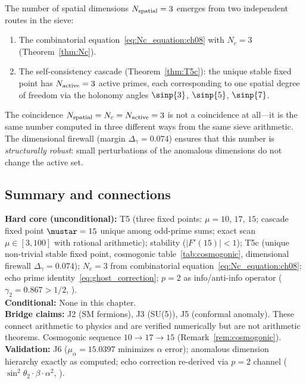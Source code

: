 \documentclass[12pt,a4paper]{article}
\begin{document}
\begin{remark}
\label{rem:3d_theorem}
The number of spatial dimensions $N_{\rm spatial} = 3$ emerges from
two independent routes in the sieve:
\begin{enumerate}[nosep]
\item The combinatorial equation~\eqref{eq:Nc_equation:ch08} with
  $N_c = 3$ (Theorem~\ref{thm:Nc}).
\item The self-consistency cascade
  (Theorem~\ref{thm:T5c}): the unique stable fixed point has
  $N_{\rm active} = 3$ active primes, each corresponding to one
  spatial degree of freedom via the holonomy angles
  $\sinp{3}$, $\sinp{5}$, $\sinp{7}$.
\end{enumerate}
The coincidence $N_{\rm spatial} = N_c = N_{\rm active} = 3$ is not
a coincidence at all---it is the same number computed in three
different ways from the same sieve arithmetic.  The dimensional
firewall (margin $\Delta_\gamma = 0.074$) ensures that this number
is \emph{structurally robust}: small perturbations of the anomalous
dimensions do not change the active set.
\end{remark}

\subsection{Summary and connections}
\label{sec:ch8_summary}

\begin{ledgerbox}
\textbf{Hard core (unconditional):} T5 (three fixed points:
  $\mu = 10$, $17$, $15$; cascade fixed point $\mustar = 15$ unique
  among odd-prime sums; exact scan $\mu \in [3,100]$ with rational
  arithmetic); stability ($|F'(15)| < 1$);
  T5c (unique non-trivial stable fixed point, cosmogonic
  table~\ref{tab:cosmogonic}, dimensional firewall
  $\Delta_\gamma = 0.074$);
  $N_c = 3$ from combinatorial equation~\eqref{eq:Nc_equation:ch08};
  echo prime identity~\eqref{eq:ghost_correction};
  $p = 2$ as info/anti-info operator ($\gamma_2 = 0.867 > 1/2$,
  \cite{companion_M1}).\\[4pt]
\textbf{Conditional:} None in this chapter.\\[4pt]
\textbf{Bridge claims:} J2 (SM fermions), J3 (SU(5)), J5 (conformal
  anomaly). These connect arithmetic to physics and are verified
  numerically but are not arithmetic theorems.
  Cosmogonic sequence $10 \to 17 \to 15$
  (Remark~\ref{rem:cosmogonic}).\\[4pt]
\textbf{Validation:} J6 ($\mu_\alpha = 15.0397$ minimizes $\alpha$ error);
  anomalous dimension hierarchy exactly as computed; echo correction
  re-derived via $p = 2$ channel ($\sin^2\theta_2 \cdot \beta \cdot \alpha^2$,
  \cite{companion_physics}).
\end{ledgerbox}
\end{document}
